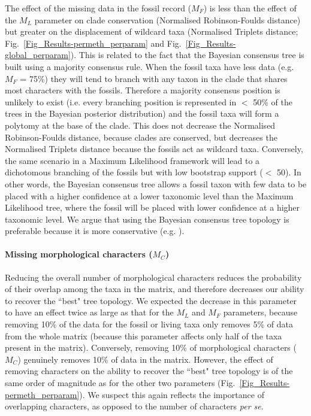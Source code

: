 \documentclass[10pt,letterpaper]{article}
\begin{document}
The effect of the missing data in the fossil record ($M_{F}$) is less than the effect of the $M_{L}$ parameter on clade conservation (Normalised Robinson-Foulds distance) but greater on the displacement of wildcard taxa (Normalised Triplets distance; Fig.~\ref{Fig_Results-permeth_perparam} and Fig.~\ref{Fig_Results-global_perparam}). This is related to the fact that the Bayesian consensus tree is built using a majority consensus rule. When the fossil taxa have less data (e.g. $M_{F}$ = 75\%) they will tend to branch with any taxon in the clade that shares most characters with the fossils. Therefore a majority consensus position is unlikely to exist (i.e. every branching position is represented in $<$ 50\% of the trees in the Bayesian posterior distribution) and the fossil taxa will form a polytomy at the base of the clade. This does not decrease the Normalised Robinson-Foulds distance, because clades are conserved, but decreases the Normalised Triplets distance because the fossils act as wildcard taxa. Conversely, the same scenario in a Maximum Likelihood framework will lead to a dichotomous branching of the fossils but with low bootstrap support ($<$ 50). In other words, the Bayesian consensus tree allows a fossil taxon with few data to be placed with a higher confidence at a lower taxonomic level than the Maximum Likelihood tree, where the fossil will be placed with lower confidence at a higher taxonomic level. We argue that using the Bayesian consensus tree topology is preferable because it is more conservative (e.g. \cite{pattinsonphylogeny2014}).

\paragraph*{Missing morphological characters ($M_{C}$)}
Reducing the overall number of morphological characters reduces the probability of their overlap among the taxa in the matrix, and therefore decreases our ability to recover the ``best" tree topology. We expected the decrease in this parameter to have an effect twice as large as that for the $M_{L}$ and $M_{F}$ parameters, because removing 10\% of the data for the fossil or living taxa only removes 5\% of data from the whole matrix (because this parameter affects only half of the taxa present in the matrix). Conversely, removing 10\% of morphological characters ($M_{C}$) genuinely removes 10\% of data in the matrix. However, the effect of removing characters on the ability to recover the ``best" tree topology is of the same order of magnitude as for the other two parameters (Fig.~\ref{Fig_Results-permeth_perparam}). We suspect this again reflects the importance of overlapping characters, as opposed to the number of characters \textit{per se}.
\end{document}
